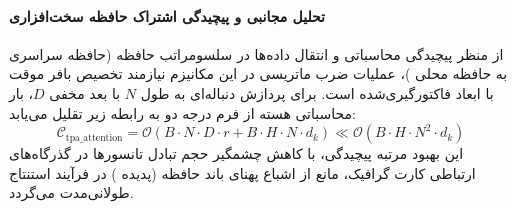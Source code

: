 \paragraph{تحلیل مجانبی و پیچیدگی اشتراک حافظه سخت‌افزاری}
از منظر پیچیدگی محاسباتی و انتقال داده‌ها در سلسومراتب حافظه (حافظه سراسری  به حافظه محلی )، عملیات ضرب ماتریسی در این مکانیزم نیازمند تخصیص بافر موقت با ابعاد فاکتورگیری‌شده است. برای پردازش دنباله‌ای به طول $N$ با بعد مخفی $D$، بار محاسباتی هسته از فرم درجه دو به رابطه زیر تقلیل می‌یابد:
\begin{equation}
\label{eq:complexity_tpa_attention}
\mathcal{C}_{\text{tpa\_attention}} = \mathcal{O}\left( B \cdot N \cdot D \cdot r + B \cdot H \cdot N \cdot d_k \right) \ll \mathcal{O}\left( B \cdot H \cdot N^2 \cdot d_k \right)
\end{equation}
این بهبود مرتبه پیچیدگی، با کاهش چشمگیر حجم تبادل تانسورها در گذرگاه‌های ارتباطی کارت گرافیک، مانع از اشباع پهنای باند حافظه (پدیده ) در فرآیند استنتاج طولانی‌مدت می‌گردد.
